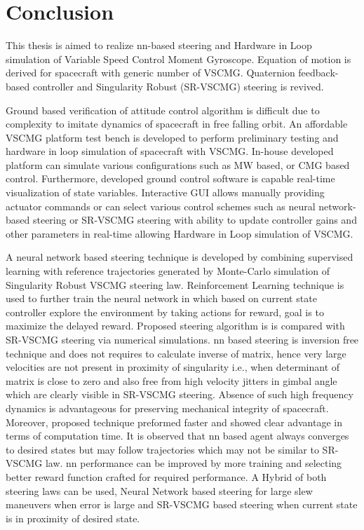 \chapter{Conclusion}
This thesis is aimed to realize \acrfull{nn}-based steering and Hardware in Loop simulation of Variable Speed Control Moment Gyroscope. Equation of motion is derived for spacecraft with generic number of VSCMG. Quaternion feedback-based controller and Singularity Robust (SR-VSCMG) steering is revived.

Ground based verification of attitude control algorithm is difficult due to complexity to imitate dynamics of spacecraft in free falling orbit. An affordable VSCMG platform test bench is developed to perform preliminary testing and hardware in loop simulation of spacecraft with VSCMG. In-house developed platform can simulate various configurations such as MW based, or CMG based control. Furthermore, developed ground control software is capable real-time visualization of state variables. Interactive GUI allows manually providing actuator commands or can select various control schemes such as neural network-based steering or SR-VSCMG steering with ability to update controller gains and other parameters in real-time allowing Hardware in Loop simulation of VSCMG.

A neural network based steering technique is developed by combining supervised learning with reference trajectories generated by Monte-Carlo simulation of Singularity Robust VSCMG steering law. Reinforcement Learning technique is used to further train the neural network in which based on current state controller explore the environment by taking actions for reward, goal is to maximize the delayed reward. Proposed steering algorithm is is compared with SR-VSCMG steering via numerical simulations. \acrshort{nn} based steering is inversion free technique and does not requires to calculate inverse of matrix, hence very large velocities are not present in proximity of singularity i.e., when determinant of matrix is close to zero and also free from high velocity jitters in gimbal angle which are clearly visible in SR-VSCMG steering. Absence of such high frequency dynamics is advantageous for preserving mechanical integrity of spacecraft. Moreover, proposed technique preformed faster and showed clear advantage in terms of computation time.  It is observed that \acrshort{nn} based agent always converges to desired states but may follow trajectories which may not be similar to SR-VSCMG law. \acrshort{nn} performance can be improved by more training and selecting better reward function crafted for required performance. A Hybrid of both steering laws can be used, Neural Network based steering for large slew maneuvers when error is large and SR-VSCMG based steering when current state is in proximity of desired state.
